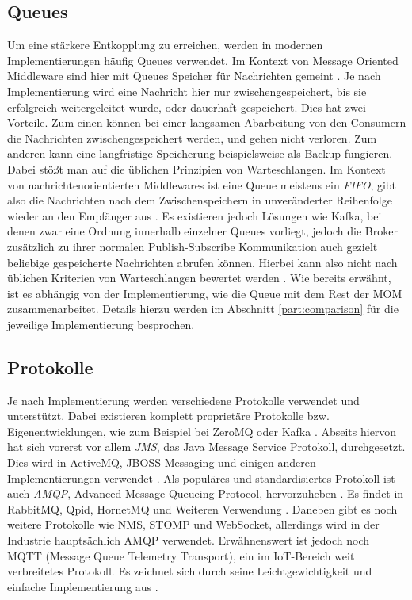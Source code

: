 \subsection{Queues}
\label{definition:queues}
Um eine stärkere Entkopplung zu erreichen, werden in modernen Implementierungen
häufig Queues verwendet.
Im Kontext von Message Oriented Middleware sind hier mit Queues
Speicher für Nachrichten gemeint \cite{curry2004message}.
Je nach Implementierung wird eine Nachricht hier nur zwischengespeichert, bis
sie erfolgreich weitergeleitet wurde, oder dauerhaft gespeichert.
Dies hat zwei Vorteile. Zum einen können bei einer langsamen Abarbeitung von
den Consumern die Nachrichten zwischengespeichert werden, und gehen nicht verloren.
Zum anderen kann eine langfristige Speicherung beispielsweise als Backup fungieren.
Dabei stößt man auf die üblichen Prinzipien von Warteschlangen. Im Kontext von
nachrichtenorientierten Middlewares ist eine Queue meistens ein \textit{FIFO},
gibt also die Nachrichten nach dem Zwischenspeichern in unveränderter Reihenfolge
wieder an den Empfänger aus \cite{curry2004message}.
Es existieren jedoch Lösungen wie Kafka, bei denen zwar eine Ordnung innerhalb
einzelner Queues vorliegt, jedoch die Broker zusätzlich zu ihrer normalen
Publish-Subscribe Kommunikation auch gezielt beliebige gespeicherte Nachrichten
abrufen können. Hierbei kann also nicht nach üblichen Kriterien von
Warteschlangen bewertet werden \cite{ApacheKa84:online}.
Wie bereits erwähnt, ist es abhängig von der Implementierung, wie die Queue
mit dem Rest der MOM zusammenarbeitet. Details hierzu werden im Abschnitt
\ref{part:comparison} für die jeweilige Implementierung besprochen.

\subsection{Protokolle}
Je nach Implementierung werden verschiedene Protokolle verwendet und unterstützt.
Dabei existieren komplett proprietäre Protokolle bzw. Eigenentwicklungen, wie zum
Beispiel bei ZeroMQ oder Kafka \cite{ApacheKa84:online}. 
Abseits hiervon hat sich vorerst vor allem \textit{JMS}, das Java Message
Service Protokoll, durchgesetzt. Dies wird in ActiveMQ, JBOSS Messaging und
einigen anderen Implementierungen verwendet \cite{dobbelaere2017kafka}.
Als populäres und standardisiertes Protokoll ist auch \textit{AMQP},
Advanced Message Queueing Protocol, hervorzuheben \cite{vinoski2006advanced}.
Es findet in RabbitMQ, Qpid, HornetMQ und Weiteren Verwendung \cite{dobbelaere2017kafka}.
Daneben gibt es noch weitere Protokolle wie NMS, STOMP und WebSocket, allerdings
wird in der Industrie hauptsächlich AMQP verwendet. \cite{vinoski2006advanced}
Erwähnenswert ist jedoch noch MQTT (Message Queue Telemetry Transport), ein
im IoT-Bereich weit verbreitetes Protokoll. Es zeichnet sich durch seine
Leichtgewichtigkeit und einfache Implementierung aus \cite{dobbelaere2017kafka}.

